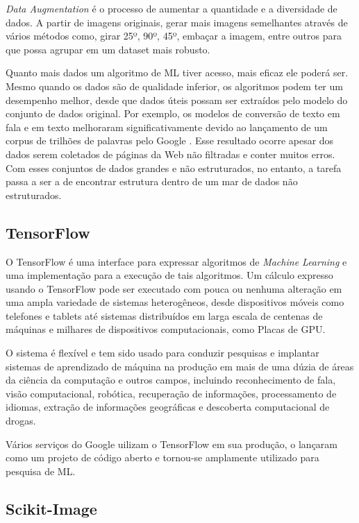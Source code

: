 \textit{Data Augmentation} é o processo de aumentar a quantidade e a diversidade de dados. A partir de imagens originais, gerar mais imagens semelhantes através de vários métodos como, girar 25º, 90º, 45º, embaçar a imagem, entre outros para que possa agrupar em um dataset mais robusto.

Quanto mais dados um algoritmo de ML tiver acesso, mais eficaz ele poderá ser. Mesmo quando os dados são de qualidade inferior, os algoritmos podem ter um desempenho melhor, desde que dados úteis possam ser extraídos pelo modelo do conjunto de dados original. Por exemplo, os modelos de conversão de texto em fala e em texto melhoraram significativamente devido ao lançamento de um corpus de trilhões de palavras pelo Google \cite{halevy2009unreasonable}. Esse resultado ocorre apesar dos dados serem coletados de páginas da Web não filtradas e conter muitos erros. Com esses conjuntos de dados grandes e não estruturados, no entanto, a tarefa passa a ser a de encontrar estrutura dentro de um mar de dados não estruturados. \cite{dataAug}

\subsection{TensorFlow}

O TensorFlow é uma interface para expressar algoritmos de \textit{Machine Learning} e uma implementação para a execução de tais algoritmos. Um cálculo expresso usando o TensorFlow pode ser executado com pouca ou nenhuma alteração em uma ampla variedade de sistemas heterogêneos, desde dispositivos móveis como telefones e tablets até sistemas distribuídos em larga escala de centenas de máquinas e milhares de dispositivos computacionais, como Placas de GPU. 

O sistema é flexível e tem sido usado para conduzir pesquisas e implantar sistemas de aprendizado de máquina na produção em mais de uma dúzia de áreas da ciência da computação e outros campos, incluindo reconhecimento de fala, visão computacional, robótica, recuperação de informações, processamento de idiomas, extração de informações geográficas e descoberta computacional de drogas. \cite{abadi2016tensorflow}

Vários serviços do Google uilizam o TensorFlow em sua produção, o lançaram como um projeto de código aberto e
tornou-se amplamente utilizado para pesquisa de ML.\cite{199317}

\subsection{Scikit-Image}

